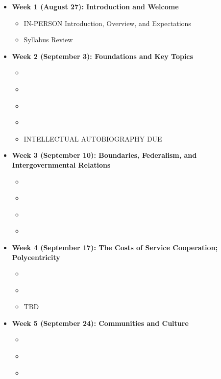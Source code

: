 \documentclass[12pt, letterpaper]{article}
\begin{document}
\begin{itemize}
	\item[] \textbf{Week 1 (August 27): Introduction and Welcome}
	\begin{itemize}
		\item IN-PERSON Introduction, Overview, and Expectations
		\item Syllabus Review
	\end{itemize} 
	
	\item[] \textbf{Week 2 (September 3): Foundations and Key Topics}
		\begin{itemize}
			\item \citet[chap.~1]{Henderson2015}
			\item \citet[chap.~1]{Agranoff2012}
			\item \citet{Bryson2006} 
			\item \citet[chap.~1]{Bingham2008}
			\item INTELLECTUAL AUTOBIOGRAPHY DUE
		\end{itemize}
	
	
	\item[] \textbf{Week 3 (September 10): Boundaries, Federalism, and Intergovernmental Relations}
		\begin{itemize}
			\item \citet[chap.~2–3]{Agranoff2012}
			\item  \citet[chap.~intro,~1]{Agranoff2017}
			\item  \citet{Schneider2009}
			\item \cite{Gerlak2006}
		\end{itemize}
		
	\item[] \textbf{Week 4 (September 17): The Costs of Service Cooperation; Polycentricity}
		\begin{itemize}
			\item \citet[chap.~2]{Henderson2015}
			\item  \citet[chap.~1]{Oakerson1999}
			\item  TBD
		\end{itemize}
	
	\item[] \textbf{Week 5 (September 24): Communities and Culture}
		\begin{itemize}
			\item \citet[chap.~3]{Henderson2015}
			\item  \citet[chap.~4]{Wondolleck2000}
			\item  \citet[chap.~1]{Sirianni2009}
		\end{itemize}


\end{itemize}
\end{document}
